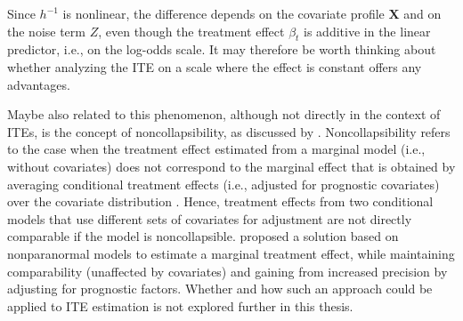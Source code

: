 Since $h^{-1}$ is nonlinear, the difference depends on the covariate profile $\mathbf{X}$ and on the noise term $Z$, even though the treatment effect $\beta_t$ is additive in the linear predictor, i.e., on the log-odds scale. It may therefore be worth thinking about whether analyzing the ITE on a scale where the effect is constant offers any advantages.

\medskip


Maybe also related to this phenomenon, although not directly in the context of ITEs, is the concept of noncollapsibility, as discussed by \citet{dandl2025}. Noncollapsibility refers to the case when the treatment effect estimated from a marginal model (i.e., without covariates) does not correspond to the marginal effect that is obtained by averaging conditional treatment effects (i.e., adjusted for prognostic covariates) over the covariate distribution \citet{aalen2015}. Hence, treatment effects from two conditional models that use different sets of covariates for adjustment are not directly comparable if the model is noncollapsible. \citet{dandl2025} proposed a solution based on nonparanormal models \citep{liu2009, klein2022} to estimate a marginal treatment effect, while maintaining comparability (unaffected by covariates) and gaining from increased precision by adjusting for prognostic factors. Whether and how such an approach could be applied to ITE estimation is not explored further in this thesis.



